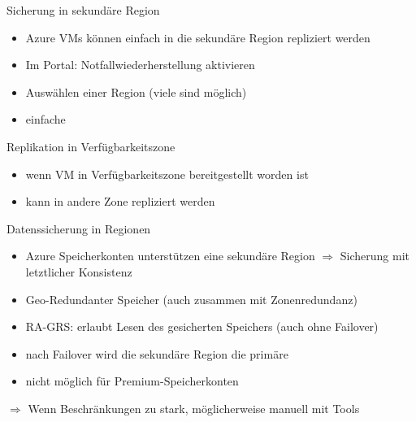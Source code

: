 
\begin{flashcard}[Definition]{Sicherung in sekundäre Region}
  \begin{itemize}
    \item Azure VMs können einfach in die sekundäre Region repliziert werden
    \item Im Portal: Notfallwiederherstellung aktivieren
    \item Auswählen einer Region (viele sind möglich)
    \item einfache
  \end{itemize}
\end{flashcard}

\begin{flashcard}[Definition]{Replikation in Verfügbarkeitszone}
  \begin{itemize}
    \item wenn VM in Verfügbarkeitszone bereitgestellt worden ist
    \item kann in andere Zone repliziert werden
  \end{itemize}
\end{flashcard}

\begin{flashcard}[Definition]{Datenssicherung in Regionen}
  \begin{itemize}
    \item Azure Speicherkonten unterstützen eine sekundäre Region\newline
    $\Rightarrow$ Sicherung mit letztlicher Konsistenz
    \item Geo-Redundanter Speicher (auch zusammen mit Zonenredundanz)
    \item RA-GRS: erlaubt Lesen des gesicherten Speichers (auch ohne Failover)
    \item nach Failover wird die sekundäre Region die primäre
    \item nicht möglich für Premium-Speicherkonten
  \end{itemize}
  $\Rightarrow$ Wenn Beschränkungen zu stark, möglicherweise manuell mit Tools
\end{flashcard}

